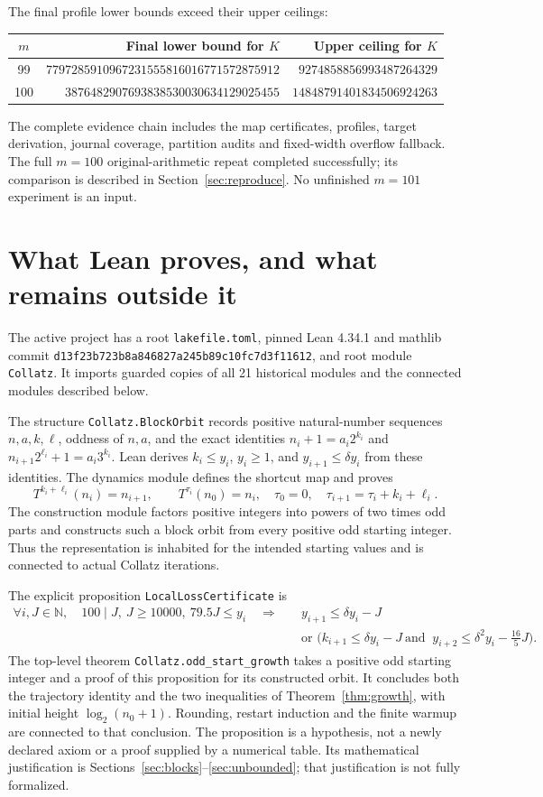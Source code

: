 \documentclass[11pt]{article}
\theoremstyle{definition}\newtheorem{definition}[theorem]{Definition}
\newcommand{\NN}{\mathbb N}
\begin{document}
The final profile lower bounds exceed their upper ceilings:
\begin{center}\small
\begin{tabular}{crr}\toprule
$m$&Final lower bound for $K$&Upper ceiling for $K$\\\midrule
99&$7797285910967231555816016771572875912$&$9274858856993487264329$\\
100&$3876482907693838530030634129025455$&$14848791401834506924263$\\\bottomrule
\end{tabular}
\end{center}
The complete evidence chain includes the map certificates, profiles, target derivation, journal coverage, partition audits and fixed-width overflow fallback. The full $m=100$ original-arithmetic repeat completed successfully; its comparison is described in Section~\ref{sec:reproduce}. No unfinished $m=101$ experiment is an input.

\section{What Lean proves, and what remains outside it}\label{sec:lean}
The active project has a root \texttt{lakefile.toml}, pinned Lean 4.34.1 and mathlib commit \texttt{d13f23b723b8a846827a245b89c10fc7d3f11612}, and root module \texttt{Collatz}. It imports guarded copies of all 21 historical modules and the connected modules described below.

The structure \texttt{Collatz.BlockOrbit} records positive natural-number sequences $n,a,k,\ell$, oddness of $n,a$, and the exact identities $n_i+1=a_i2^{k_i}$ and $n_{i+1}2^{\ell_i}+1=a_i3^{k_i}$. Lean derives $k_i\le y_i$, $y_i\ge1$, and $y_{i+1}\le\delta y_i$ from these identities. The dynamics module defines the shortcut map and proves
\[
 T^{k_i+\ell_i}(n_i)=n_{i+1},\qquad T^{\tau_i}(n_0)=n_i,
 \quad \tau_0=0,\quad\tau_{i+1}=\tau_i+k_i+\ell_i.
\]
The construction module factors positive integers into powers of two times odd parts and constructs such a block orbit from every positive odd starting integer. Thus the representation is inhabited for the intended starting values and is connected to actual Collatz iterations.

The explicit proposition \texttt{LocalLossCertificate} is
\begin{align*}
 \forall i,J\in\NN,\quad 100\mid J,\ J\ge10000,\ 79.5J\le y_i
 \quad\Longrightarrow\quad& y_{i+1}\le\delta y_i-J\\
 &\text{or }\bigl(k_{i+1}\le\delta y_i-J\ \text{and }\
 y_{i+2}\le\delta^2y_i-\tfrac{16}{5}J\bigr).
\end{align*}
The top-level theorem \texttt{Collatz.odd\_start\_growth} takes a positive odd starting integer and a proof of this proposition for its constructed orbit. It concludes both the trajectory identity and the two inequalities of Theorem~\ref{thm:growth}, with initial height $\log_2(n_0+1)$. Rounding, restart induction and the finite warmup are connected to that conclusion. The proposition is a hypothesis, not a newly declared axiom or a proof supplied by a numerical table. Its mathematical justification is Sections~\ref{sec:blocks}--\ref{sec:unbounded}; that justification is not fully formalized.
\end{document}

